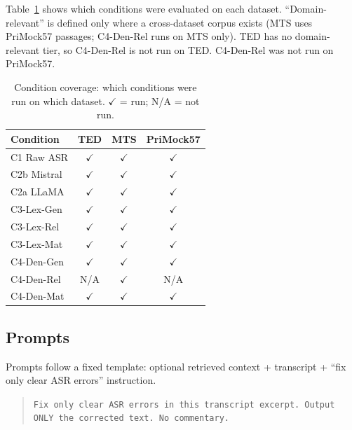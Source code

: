 \documentclass[11pt,a4paper,twocolumn]{article}
\begin{document}
Table~\ref{tab:conditions} shows which conditions were evaluated on each
dataset. ``Domain-relevant'' is defined only where a cross-dataset corpus
exists (MTS uses PriMock57 passages; C4-Den-Rel runs on MTS only). TED has no
domain-relevant tier, so C4-Den-Rel is not run on TED. C4-Den-Rel was not run
on PriMock57.

\begin{table}[H]
\centering
\caption{Condition coverage: which conditions were run on which dataset.
$\checkmark$ = run; N/A = not run.}
\label{tab:conditions}
\small
\setlength{\tabcolsep}{5pt}
\renewcommand{\arraystretch}{1.15}
\begin{tabular}{lccc}
\toprule
\textbf{Condition} & \textbf{TED} & \textbf{MTS} & \textbf{PriMock57} \\
\midrule
C1 Raw ASR      & $\checkmark$ & $\checkmark$ & $\checkmark$ \\
C2b Mistral     & $\checkmark$ & $\checkmark$ & $\checkmark$ \\
C2a LLaMA       & $\checkmark$ & $\checkmark$ & $\checkmark$ \\
\midrule
C3-Lex-Gen      & $\checkmark$ & $\checkmark$ & $\checkmark$ \\
C3-Lex-Rel      & $\checkmark$ & $\checkmark$ & $\checkmark$ \\
C3-Lex-Mat      & $\checkmark$ & $\checkmark$ & $\checkmark$ \\
C4-Den-Gen      & $\checkmark$ & $\checkmark$ & $\checkmark$ \\
C4-Den-Rel      & N/A          & $\checkmark$ & N/A          \\
C4-Den-Mat      & $\checkmark$ & $\checkmark$ & $\checkmark$ \\
\bottomrule
\end{tabular}
\end{table}

\subsection{Prompts}
\label{sec:prompts}

Prompts follow a fixed template: optional retrieved context + transcript +
``fix only clear ASR errors'' instruction.

\begin{quote}
\small
\texttt{Fix only clear ASR errors in this transcript excerpt. Output ONLY the corrected text. No commentary.}
\end{quote}
\end{document}
